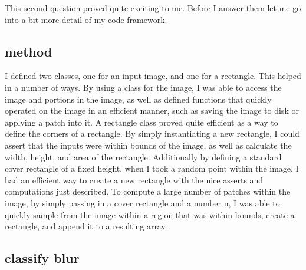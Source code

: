 \documentclass[11pt]{article}
\begin{document}
This second question proved quite exciting to me. Before I answer
them let me go into a bit more detail of my code framework.

\subsection*{method}

I defined two classes, one for an input image, and one for a rectangle.
This helped in a number of ways.  By using a class for the image, I was
able to access the image and portions in the image, as well as defined
functions that quickly operated on the image in an efficient manner, such
as saving the image to disk or applying a patch into it.  A rectangle class
proved quite efficient as a way to define the corners of a rectangle.
By simply instantiating a new rectangle, I could assert that the inputs
were within bounds of the image, as well as calculate the width, height,
and area of the rectangle. Additionally by defining a standard cover
rectangle of a fixed height, when I took a random point within the image,
I had an efficient way to create a new rectangle with the nice asserts
and computations just described. To compute a large number of patches
within the image, by simply passing in a cover rectangle and a number n,
I was able to quickly sample from the image within a region that was within
bounds, create a rectangle, and append it to a resulting array.

\subsection*{classify blur}
\end{document}
